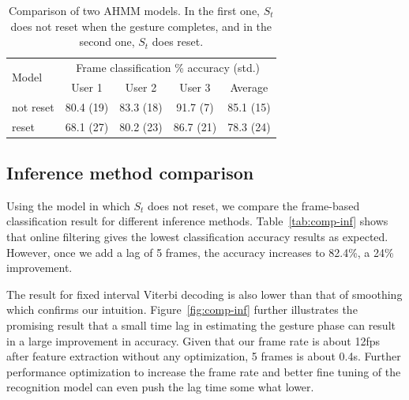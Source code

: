 \documentclass[10pt,twocolumn,letterpaper]{article}
\begin{document}
\begin{table}[tb]
\begin{center}
\begin{tabularx}{0.5\textwidth}{|X|c|c|c|c|}
\hline
\multirow{2}{*}{Model} & \multicolumn{4}{c|}{Frame classification \% accuracy (std.)} \\
\cline{2-5}
      & User 1 & User 2 & User 3 & Average \\
\hline\hline
not reset & 80.4 (19) & 83.3 (18) & 91.7 (7) & 85.1 (15) \\ 
reset & 68.1 (27) & 80.2 (23) & 86.7 (21) & 78.3 (24) \\
\hline
\end{tabularx}
\end{center}
\caption{Comparison of two AHMM models. In the first one, $S_t$ does not reset when the 
gesture completes, and in the second one, $S_t$ does reset. }
\label{tab:comp-model}
\end{table}

\subsection{Inference method comparison} \label{sec:comp-inf}
Using the model in which $S_t$ does not reset, we compare the frame-based
classification result for different inference methods. Table~\ref{tab:comp-inf}
shows that online filtering gives the lowest classification accuracy results as
expected. However, once we add a lag of 5 frames, the accuracy increases to 82.4\%,
a 24\% improvement. 

The result for fixed interval Viterbi decoding is also lower than that of 
smoothing which confirms our intuition. Figure~\ref{fig:comp-inf}
further illustrates the promising result that a small time lag in estimating the 
gesture phase can result in a large improvement in accuracy. Given that our frame 
rate is about 12fps after feature extraction without any optimization, 5 frames is about 0.4s. Further performance optimization
to increase the frame rate and better fine tuning of the recognition model can even push the lag time
some what lower.
\end{document}
